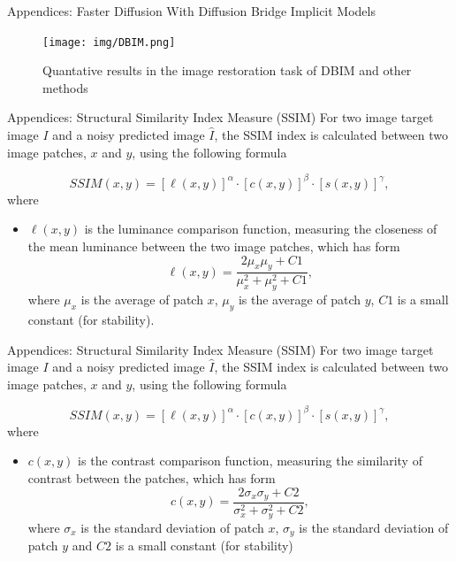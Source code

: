 \begin{frame}{Appendices: Faster Diffusion With Diffusion Bridge Implicit Models}
\begin{figure}[t]
    \centering
    \texttt{[image: img/DBIM.png]}
    \caption{Quantative results in the image restoration task of DBIM and other methods\footnotemark}
    \label{fig:groundedsam}
\end{figure}
\end{frame}

\begin{frame}{Appendices: Structural Similarity Index Measure (SSIM)}
For two image target image $I$ and a noisy predicted image $\hat{I}$, the SSIM index is calculated between two image patches, $x$ and $y$, using the following formula

\begin{equation}
    SSIM(x, y) = [\ell(x, y)]^\alpha \cdot [c(x, y)]^\beta \cdot [s(x, y)]^\gamma,
\end{equation}
where
\begin{itemize}
    \item $\ell(x, y)$ is the luminance comparison function, measuring the closeness of the mean luminance between the two image patches, which has form
          \begin{equation*}
              \ell(x, y) = \frac{2 \mu_x \mu_y + C1}{\mu_x^2 + \mu_y^2 + C1},
          \end{equation*}
          where $\mu_x$ is the average of patch $x$, $\mu_y$ is the average of patch $y$, $C1$ is a small constant (for stability).
\end{itemize}
\end{frame}

\begin{frame}{Appendices: Structural Similarity Index Measure (SSIM)}
For two image target image $I$ and a noisy predicted image $\hat{I}$, the SSIM index is calculated between two image patches, $x$ and $y$, using the following formula

\begin{equation}
    SSIM(x, y) = [\ell(x, y)]^\alpha \cdot [c(x, y)]^\beta \cdot [s(x, y)]^\gamma,
\end{equation}
where
\begin{itemize}
    
    \item  $c(x, y)$ is the contrast comparison function, measuring the similarity of contrast between the patches, which has form
          \begin{equation*}
              c(x, y) = \frac{2 \sigma_x \sigma_y + C2}{\sigma_x^2 + \sigma_y^2 + C2},
          \end{equation*}
          where $\sigma_x$ is the standard deviation of patch $x$, $\sigma_y$ is the standard deviation of patch $y$ and $C2$ is a small constant (for stability)
\end{itemize}
\end{frame}

